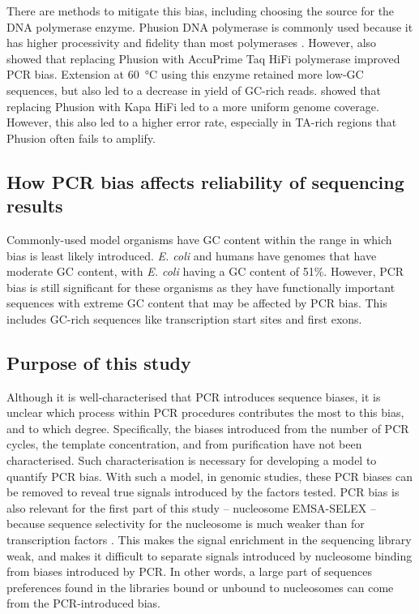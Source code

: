 \documentclass[a4paper, numbers=noenddot]{scrbook}
\begin{document}
There are methods to mitigate this bias, including choosing the source for the DNA polymerase enzyme.  Phusion DNA polymerase is commonly used because it has higher processivity and fidelity than most polymerases \citep{quail_optimal_2012}.  However, \citet{aird_analyzing_2011} also showed that replacing Phusion with AccuPrime Taq HiFi polymerase improved PCR bias.  Extension at \SI{60}{\celsius} using this enzyme retained more low-GC sequences, but also led to a decrease in yield of GC-rich reads.  \citet{quail_optimal_2012} showed that replacing Phusion with Kapa HiFi led to a more uniform genome coverage.  However, this also led to a higher error rate, especially in TA-rich regions that Phusion often fails to amplify.

\subsection{How PCR bias affects reliability of sequencing results}
\label{ssec:pcrbias_intro_effects}

Commonly-used model organisms have GC content within the range in which bias is least likely introduced.  \emph{E. coli} and humans have genomes that have moderate GC content, with \emph{E. coli} having a GC content of 51\%.  However, PCR bias is still significant for these organisms as they have functionally important sequences with extreme GC content that may be affected by PCR bias.  This includes GC-rich sequences like transcription start sites and first exons.  %

\subsection{Purpose of this study}
\label{ssec:pcrbias_intro_why}

Although it is well-characterised that PCR introduces sequence biases, it is unclear which process within PCR procedures contributes the most to this bias, and to which degree.  Specifically, the biases introduced from the number of PCR cycles, the template concentration, and from purification have not been characterised.  Such characterisation is necessary for developing a model to quantify PCR bias.  With such a model, in genomic studies, these PCR biases can be removed to reveal true signals introduced by the factors tested.  PCR bias is also relevant for the first part of this study -- nucleosome EMSA-SELEX -- because sequence selectivity for the nucleosome is much weaker than for transcription factors \citep{struhl_determinants_2013}.  This makes the signal enrichment in the sequencing library weak, and makes it difficult to separate signals introduced by nucleosome binding from biases introduced by PCR.  In other words, a large part of sequences preferences found in the libraries bound or unbound to nucleosomes can come from the PCR-introduced bias.
\end{document}
